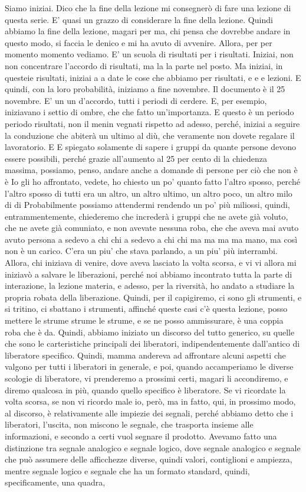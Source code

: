 Siamo iniziai. Dico che la fine della lezione mi consegnerò di fare una lezione di questa serie. E' quasi un grazzo di considerare la fine della lezione. Quindi abbiamo la fine della lezione, magari per ma, chi pensa che dovrebbe andare in questo modo, si faccia le denico e mi ha avuto di avvenire. Allora, per per momento momento vediamo. E' un scuola di risultati per i risultati. Iniziai, non non concentrare l'accordo di risultati, ma la la parte nel posto. Ma iniziai, in questeie risultati, iniziai a a date le cose che abbiamo per risultati, e e e lezioni. E quindi, con la loro probabilità, iniziamo a fine novembre. Il documento è il 25 novembre. E' un un d'accordo, tutti i periodi di cerdere. E, per esempio, iniziavano i settio di ombre, che che fatto un'importanza. E questo è un periodo periodo risultati, non il menin vegnati rispetto ad adesso, perché, iniziai a seguire la conduzione che abiterà un ultimo al diù, che veramente non dovete regalare il lavoratorio. E E spiegato solamente di sapere i gruppi da quante persone devono essere possibili, perché grazie all'aumento al 25 per cento di la chiedenza massima, possiamo, penso, andare anche a domande di persone per ciò che non è è Io gli ho affrontato, vedete, ho chiesto un po' quanto fatto l'altro sposso, perché l'altro sposso di tutti era un altro, un altro ultimo, un altro poco, un altro milo di di Probabilmente possiamo attendermi rendendo un po' più miliossi, quindi, entrammentemente, chiederemo che increderà i gruppi che ne avete già voluto, che ne avete già comuniato, e non avevate nessuna roba, che che aveva mai avuto avuto persona a sedevo a chi chi a sedevo a chi chi ma ma ma ma mano, ma così non è un carico. C'era un piu' che stava parlando, a un piu' più interrambi. Allora, chi iniziava di venire, dove aveva lasciato la volta scorsa, e vi vi allora mi iniziavò a salvare le liberazioni, perché noi abbiamo incontrato tutta la parte di interazione, la lezione materia, e adesso, per la riversità, ho andato a studiare la propria robata della liberazione. Quindi, per il capigiremo, ci sono gli strumenti, e si tritino, ci sbattano i strumenti, affinché queste casi c'è questa lezione, posso mettere le strume strume le strume, e se ne posso ammissurare, è una coppia roba che è da. Quindi, abbiamo iniziato un discorso del tutto generico, su quelle che sono le carteristiche principali dei liberatori, indipendentemente dall'antico di liberatore specifico. Quindi, mamma andereva ad affrontare alcuni aspetti che valgono per tutti i liberatori in generale, e poi, quando accamperiamo le diverse scologie di liberatore, vi prenderemo a prossimi certi, magari li accondiremo, e diremo qualcosa in più, quando quello specifico è liberatore. Se vi ricordate la volta scorsa, se non vi ricordo male io, però, ma in fatto, qui, in prossimo modo, al discorso, è relativamente alle impiezie dei segnali, perché abbiamo detto che i liberatori, l'uscita, non miscono le segnale, che trasporta insieme alle informazioni, e secondo a certi vuol segnare il prodotto. Avevamo fatto una distinzione tra segnale analogico e segnale logico, dove segnale analogico e segnale che può assumere delle afficchezze diverse, quindi valori, contiglioni e ampiezza, mentre segnale logico e segnale che ha un formato standard, quindi, specificamente, una quadra, 